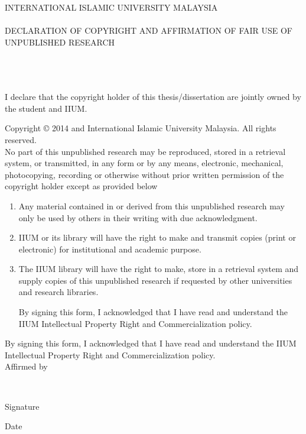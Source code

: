 \documentclass[12pt, a4paper]{memoir}
\begin{document}
\thispagestyle{empty}

\begin{center}
\begin{Large}
\MakeUppercase{International Islamic University Malaysia}\\~\\
\MakeUppercase{Declaration of Copyright and Affirmation of Fair Use of 
Unpublished Research}\\~\\
\MakeUppercase{\myTitle}\\~\\
\end{Large}
\noindent I declare that the copyright holder of this thesis/dissertation are 
jointly owned by the student and IIUM.\\
\end{center}

\noindent Copyright \copyright{} 2014 \myName and International Islamic 
University 
Malaysia. All rights reserved.\\

\noindent No part of this unpublished research may be reproduced, stored in a 
retrieval
system, or transmitted, in any form or by any means, electronic, mechanical,
photocopying, recording or otherwise without prior written permission of the
copyright holder except as provided below

\begin{enumerate}
\item Any material contained in or derived from this unpublished research
may only be used by others in their writing with due acknowledgment.

\item IIUM or its library will have the right to make and transmit copies
(print or electronic) for institutional and academic purpose.

\item The IIUM library will have the right to make, store in a retrieval system
and supply copies of this unpublished research if requested by other
universities and research libraries.

By signing this form, I acknowledged that I have read and understand the
IIUM Intellectual Property Right and Commercialization policy.
\end{enumerate}

\noindent By signing this form, I acknowledged that I have read and understand 
the
IIUM Intellectual Property Right and Commercialization policy.\\[48pt]

\noindent Affirmed by \myName\\

\vfill

\noindent \makebox[2in]{\dotfill} \hfill \makebox[2in]{\dotfill}\\
\parbox{2in}{\centering Signature} \hfill \parbox{2in}{\centering Date}
\end{document}

